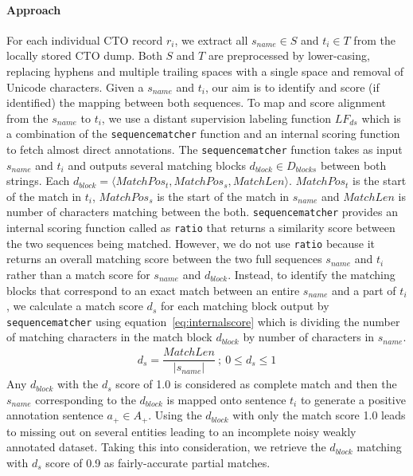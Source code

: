 \documentclass[11pt]{article}
\begin{document}
\paragraph{Approach}
For each individual CTO record $r_i$, we extract all $s_{name} \in S$ and $t_i \in T$ from the locally stored CTO dump.
Both $S$ and $T$ are preprocessed by lower-casing, replacing hyphens and multiple trailing spaces with a single space and removal of Unicode characters.
Given a $s_{name}$ and $t_i$, our aim is to identify and score (if identified) the mapping between both sequences.
To map and score alignment from the $s_{name}$ to $t_i$, we use a distant supervision labeling function $LF_{ds}$ which is a combination of the {\tt sequencematcher} function and an internal scoring function to fetch almost direct annotations.
The {\tt sequencematcher} function takes as input $s_{name}$ and $t_i$ and outputs several matching blocks $d_{block} \in D_{blocks}$ between both strings.
Each $d_{block} = \langle MatchPos_{t}, MatchPos_{s}, MatchLen \rangle $. 
$MatchPos_{t}$ is the start of the match in $t_i$, $MatchPos_{s}$ is the start of the match in $s_{name}$ and $MatchLen$ is number of characters matching between the both.
{\tt sequencematcher} provides an internal scoring function called as {\tt ratio} that returns a similarity score between the two sequences being matched.
However, we do not use {\tt ratio} because it returns an overall matching score between the two full sequences $s_{name}$ and $t_i$ rather than a match score for $s_{name}$ and $d_{block}$.
Instead, to identify the matching blocks that correspond to an exact match between an entire $s_{name}$ and a part of $t_i$, we calculate a match score $d_s$ for each matching block output by {\tt sequencematcher} using equation~\ref{eq:internalscore} which is dividing the number of matching characters in the match block $d_{block}$ by number of characters in $s_{name}$.
%
\begin{gather}
\label{eq:internalscore}
  d_s = \dfrac{ MatchLen }{ |s_{name}| } \: ; \: 0 \leq d_s \leq 1
\end{gather}
%
Any $d_{block}$ with the $d_s$ score of 1.0 is considered as complete match and then the $s_{name}$ corresponding to the $d_{block}$ is mapped onto sentence $t_i$ to generate a positive annotation sentence $a_{+} \in A_{+}$.
Using the $d_{block}$ with only the match score 1.0 leads to missing out on several entities leading to an incomplete noisy weakly annotated dataset.
Taking this into consideration, we retrieve the $d_{block}$ matching with $d_s$ score of 0.9 as fairly-accurate partial matches.
\end{document}
